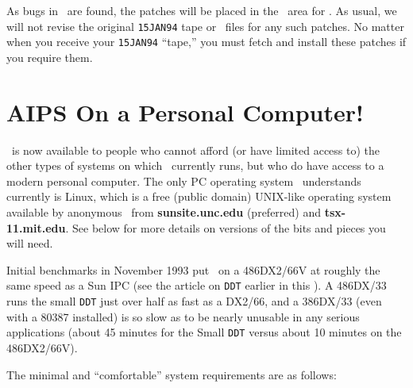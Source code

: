 As bugs in \RELEASENAME\ are found, the patches will be placed in the
\ftp\ area for \hbox{{\RELEASENAME}}.  As usual, we will not revise
the original {\tt 15JAN94} tape or \tar\ files for any such patches.  No
matter when you receive your {\tt 15JAN94} ``tape,'' you must fetch
and install these patches if you require them.

\clearpage

\section{AIPS On a Personal Computer!}

     \AIPS\ is now available to people who cannot afford (or have
limited access to) the other types of systems on which \AIPS\
currently runs, but who do have access to a modern personal computer.
The only PC operating system \AIPS\ understands currently is Linux,
which is a free (public domain) UNIX-like operating system available
by anonymous \ftp\ from {\bf sunsite.unc.edu} (preferred) and {\bf
tsx-11.mit.edu}.  See below for more details on versions of the bits
and pieces you will need.

Initial benchmarks in November 1993 put \AIPS\ on a 486DX2/66V
at roughly the same speed as a Sun IPC (see the article on {\tt DDT}
earlier in this \Aipsletter).  A 486DX/33 runs the small {\tt DDT}
just over half as fast as a DX2/66, and a 386DX/33 (even with a 80387
installed) is so slow as to be nearly unusable in any serious
applications (about 45 minutes for the Small {\tt DDT} versus about 10
minutes on the 486DX2/66V).

The minimal and ``comfortable'' system requirements are as follows:

